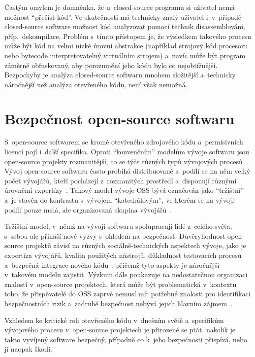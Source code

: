 Častým omylem je domněnka, že u~closed-source programu si uživatel nemá možnost ``přečíst kód''. Ve skutečnosti má technicky znalý uživatel i~v~případě closed-source software možnost kód analyzovat pomocí technik disassemblování, příp.\ dekompilace. Problém s~tímto přístupem je, že výsledkem takového procesu může být kód na velmi nízké úrovni abstrakce (například strojový kód procesoru nebo bytecode interpretovatelný virtuálním strojem) a~navíc může být program záměrně obfuskovaný, aby porozumění jeho kódu bylo co nejobtížnější. Bezpochyby je analýza closed-source softwaru mnohem složitější a~technicky náročnější než analýza otevřeného kódu, není však nemožná.

\section{Bezpečnost open-source softwaru}

S~open-source softwarem se kromě otevřeného zdrojového kódu a~permisivních licencí pojí i~další specifika. Oproti ``konvenčním'' modelům vývoje softwaru jsou open-source projekty rozmanitější, co se týče různých typů vývojových procesů~\cite{scacchi2006understanding}. Vývoj open-source softwaru často probíhá distribuovaně a~podílí se na něm velký počet vývojářů, kteří pocházejí z~rozmanitých prostředí a~disponují různými úrovněmi expertízy~\cite{wen2019security}. Takový model vývoje OSS bývá označován jako ``tržištní'' a~je stavěn do kontrastu s~vývojem ``katedrálovým'', ve kterém se na vývoji podílí pouze malá, ale organizovaná skupina vývojářů~\cite{raymond1999cathedral}.

Tržištní model, v~němž na vývoji softwaru spolupracují lidé z~celého světa, s~sebou ale přináší nové výzvy s~ohledem na bezpečnost. Důvěryhodnost open-source projektů závisí na různých so\-ci\-ál\-ně-tech\-nic\-kých aspektech vývoje, jako je expertíza vývojářů, kvalita použitých nástrojů, důk\-lad\-nost testovacích procesů a~bezpečná integrace nového kódu~\cite{oss-security-literature}, přičemž tyto aspekty je náročnější v~takovém modelu zajistit. Výzkum dále poukazuje na ne\-dos\-ta\-teč\-nou organizaci znalostí v~open-source projektech, která může být problematická v~kontextu toho, že přispěvatelé do OSS zaprvé nemusí mít potřebné znalosti pro identifikaci bezpečnostních rizik a~zadruhé bezpečnost nebývá jejich hlavním zájmem~\cite{wen2019security}.

Vzhledem ke kritické roli otevřeného kódu v~dnešním světě a~specifikům vývojového procesu v~open-source projektech je přirozené se ptát, nakolik je takto vyvíjený software bezpečný, případně co k~jeho bezpečnosti přispívá, nebo jí naopak škodí.

